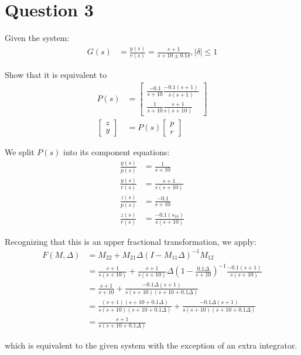 \documentclass[]{article}
\begin{document}
\section{Question 3}

\noindent Given the system:
\begin{align}
	G(s) &= \frac{y(s)}{r(s)} = \frac{s+1}{s+10 \pm 0.1 \delta}, |\delta| \leq 1
\end{align}

\noindent Show that it is equivalent to
\begin{align}
	P(s) &= \begin{bmatrix}
	\frac{-0.1}{s + 10} \frac{-0.1(s+1)}{s(s+1)} \\
	\frac{1}{s+10} \frac{s+1}{s(s+10)}
	\end{bmatrix} \\
	\begin{bmatrix}
	z \\
	y
	\end{bmatrix} &= P(s) \begin{bmatrix}
	p \\
	r
	\end{bmatrix}	
\end{align}

\noindent We split $P(s)$ into its component equations:
\begin{align}
	\frac{y(s)}{p(s)} &= \frac{1}{s+10} \\
	\frac{y(s)}{r(s)} &= \frac{s+1}{s(s+10)} \\
	\frac{z(s)}{p(s)} &= \frac{-0.1}{s + 10} \\
	\frac{z(s)}{r(s)} &= \frac{-0.1(s_10)}{s(s+10)} 
\end{align}

\noindent Recognizing that this is an upper fractional transformation, we apply:
\begin{align*}
	F(M,\Delta) &= M_{22} + M_{21}\Delta(I-M_{11}\Delta)^{-1}M_{12} \\
	&= \frac{s+1}{s(s+10)}+\frac{s+1}{s(s+10)}\Delta(1-\frac{0.1\Delta}{s+10})^{-1}\frac{-0.1(s+1)}{s(s+10)}\\
	&= \frac{s+1}{s+10} + \frac{-0.1\Delta(s+1)}{s(s+10)(s+10+0.1\Delta)} \\
	&= \frac{(s+1)(s+10+0.1\Delta)}{s(s+10)(s+10+0.1\Delta)} + \frac{-0.1\Delta(s+1)}{s(s+10)(s+10+0.1\Delta)} \\
	&= \frac{s+1}{s(s + 10 + 0.1\Delta)}
\end{align*}

\noindent which is equivalent to the given system with the exception of an extra integrator.
\end{document}
